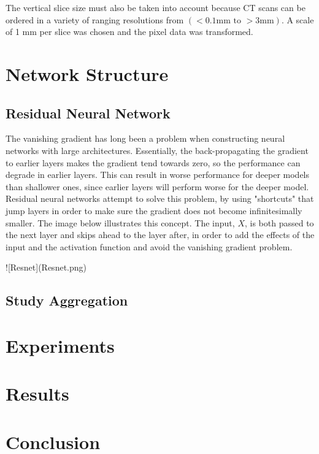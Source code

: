 \documentclass[10pt,twocolumn,letterpaper]{article}
\begin{document}
         The vertical slice size must also be taken into account because CT scans can be ordered in a variety of 
         ranging resolutions from $(<0.1\text{mm to } >3 \text{mm})$. A scale of 1 mm per slice was chosen and the
         pixel data was transformed.

\section{Network Structure} \label{sec:struct}

   \subsection{Residual Neural Network} \label{sec:struct-cnn}
        The vanishing gradient has long been a problem when constructing neural networks with large architectures. Essentially, the back-propagating the gradient to earlier layers makes the gradient tend towards zero, so the performance can degrade in earlier layers. This can result in worse performance for deeper models than shallower ones, since earlier layers will perform worse for the deeper model. Residual neural networks attempt to solve this problem, by using "shortcuts" that jump layers in order to make sure the gradient does not become infinitesimally smaller. The image below illustrates this concept. The input, $X$, is both passed to the next layer and skips ahead to the layer after, in order to add the effects of the input and the activation function and avoid the vanishing gradient problem. 

![Resnet](Resnet.png)


   \subsection{Study Aggregation} \label{sec:struct-aggr}

\section{Experiments} \label{sec:experiments}

\section{Results} \label{sec:results}

\section{Conclusion} \label{sec:conclusion}

{\small


}
\end{document}
